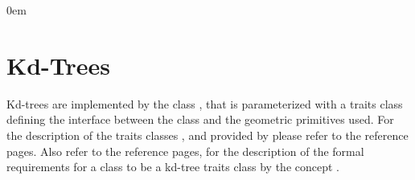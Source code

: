 %



\newcommand{\new}[1]{\marginpar{\sf #1}}
\newcommand{\kdt}{kd-tree}
\newcommand{\kdts}{kd-trees}
\newcommand{\brc}[1]{\left\{ {#1} \right\}}
\def\Ipe#1{\def\IPEfile{#1}}

\parindent0em
\setlength{\parskip}{1ex minus 0.9ex}
\sloppy

%


\clearpage

\section{Kd-Trees} 
\label{KDT_section}




Kd-trees are implemented by
the class , that is parameterized with a traits class defining
the interface between the class and the geometric primitives used.
For the description of the traits classes ,  
and  provided by {\cgal} please refer to the reference pages.
Also refer to the reference pages, for the description of the formal requirements for a class to be 
a kd-tree traits class by the concept .


